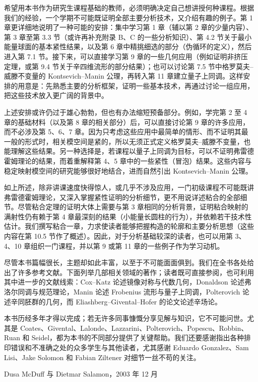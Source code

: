 希望用本书作为研究生课程基础的教师，必须明确决定自己想讲授何种课程。根据我们的经验，一个学期不可能既证明全部主要分析技术，又介绍有趣的例子。第 1 章更详细地说明了一种可能的安排：集中学习第 1 章（辅以第 2 章的少量内容）、第 3 章至第 3.3 节（或许再补充附录 B、C 的一些分析知识）、第 4.2 节关于最小能量球面的基本紧性结果，以及第 6 章中精挑细选的部分（伪循环的定义），然后进入第 7.1 节。接下来，可以直接学习第 9 章的一些几何应用（例如证明非挤压定理，或第 9.4 节关于辛四维流形的部分结果）；也可以讨论第 7.5 节中格罗莫夫--威滕不变量的 Kontsevich--Manin 公理，再转入第 11 章建立量子上同调。这样安排的用意是：先熟悉主要的分析框架，证明一些基本技术，再通过讨论一组应用，把这些技术放入更广阔的背景中。

上述安排或许仍过于雄心勃勃，但也有办法缩短预备部分。例如，学完第 2 至 4 章的基础材料（以及第 8 章的相关部分）后，可以直接讨论第 9 章的许多应用，而不必涉及第 5、6、7 章。因为只考虑这些应用中最简单的情形、而不证明其最一般的形式时，相关模空间是紧的，所以无须正式定义格罗莫夫--威滕不变量，也能理解这些结果。另一种选择是，若课程以量子上同调为目标，可以不证明弗雷德霍姆理论的结果，而着重解释第 4、5 章中的一些紧性（冒泡）结果。这些内容与稳定映射模空间的研究能够很好地结合，进而自然引出 Kontsevich--Manin 公理。

如上所述，除非讲课速度快得惊人，或几乎不涉及应用，一门初级课程不可能既讲弗雷德霍姆理论，又深入掌握紧性证明的分析细节，更不用说详述粘合的全部细节。尽管粘合定理的证明大体上需要与第 3 章相同的分析背景，证明粘合映射的满射性仍有赖于第 4 章最深刻的结果（小能量长圆柱的行为），并依赖若干技术性估计。我们撰写粘合一章，力求使读者能够把握构造的轮廓和主要分析思想（这些内容在第 10.5 节作了概述）。因此，对于分析基础较深的读者，也可以用第 3、4、10 章组织一门课程，并以第 9 或第 11 章的一些例子作为学习动机。

尽管本书篇幅很长，主题却如此丰富，以至于不可能面面俱到。我们在全书各处给出了许多参考文献。下面列举几部相关领域的著作；读者既可直接参阅，也可利用其中进一步的文献线索：Cox--Katz  论述镜像对称与代数几何，Donaldson  论述弗洛尔同调与规范理论，Manin  论述 Frobenius 流形与量子上同调，Polterovich  论述辛同胚群的几何，而 Eliashberg--Givental--Hofer  的论文论述辛场论。

本书历经多年才得以完成；若无许多同事慷慨分享见解与知识，它不可能问世。尤其是 Coates、Givental、Lalonde、Lazzarini、Polterovich、Popescu、Robbin、Ruan 和 Seidel，都为本书的不同部分提供了关键帮助。我们还要感谢指出各种排印错误和不准确之处的众多学生与其他读者，尤其感谢 Eduardo Gonzalez、Sam Lisi、Jake Solomon 和 Fabian Ziltener 对细节一丝不苟的关注。

\begin{flushright}
Dusa McDuff 与 Dietmar Salamon，2003 年 12 月
\end{flushright}
\endgroup
